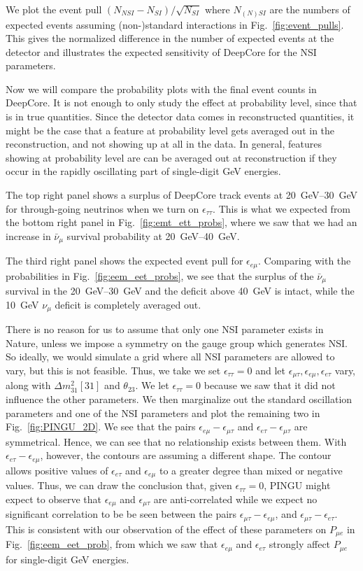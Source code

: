 \documentclass{article}
\newcommand{\emt}{\ensuremath{\epsilon_{\mu\tau}}}
\newcommand{\eet}{\epsilon_{e\tau}}
\newcommand{\eem}{\epsilon_{e\mu}}
\newcommand{\ett}{\ensuremath{\epsilon_{\tau\tau}}}
\newcommand{\nm}{\nu_\mu}
\newcommand{\anm}{\bar\nu_\mu}
\newcommand{\dm}{\Delta m^2_{31}}
\newcommand{\Pme}{P_{\mu  e}}
\begin{document}
{{ We plot the event pull $(N_{NSI} - N_{SI})/\sqrt{N_{SI}}$ where $N_{(N)SI}$ are the numbers of expected events
 assuming (non-)standard interactions in Fig.~\ref{fig:event_pulls}. This gives the normalized difference in the
 number of expected events at the detector and illustrates the expected sensitivity of DeepCore for the NSI parameters.
 
 Now we will compare the probability plots with the final event counts in DeepCore. It is not enough to only study the effect at probability level, since that is in true quantities. 
 Since the detector data comes in reconstructed quantities, it might be the case that a feature at probability level gets averaged out in the reconstruction, and not showing up at all in the data. 
 In general, features showing at probability level are can be 
 averaged out at reconstruction if they occur in the rapidly oscillating part of single-digit \si{\GeV} energies. 
 
 The top right panel shows a surplus of DeepCore track events at \SIrange{20}{30}{\GeV} for through-going neutrinos when we turn on $\ett$. This is what we expected from the bottom right panel in Fig.~\ref{fig:emt_ett_probs}, where we saw that we had an increase in $\anm$ survival probability at \SIrange{20}{40}{\GeV}. 
 
 The third right panel shows the expected event pull for $\eem$. Comparing with the probabilities in Fig.~\ref{fig:eem_eet_probs}, we see that the surplus of the $\anm$ survival in the \SIrange{20}{30}{\GeV} and the deficit above \SI{40}{\GeV} is intact, while the \SI{10}{\GeV} $\nm$ deficit is completely averaged out.
 
 There is no reason for us to assume that only one NSI parameter exists in Nature, unless we impose a symmetry on the gauge group which generates NSI. So ideally, we would simulate a grid where all NSI parameters are allowed to vary, 
 but this is not feasible. Thus, we take we set $\ett = 0$ and let $\emt,\eem,\eet$ vary, along with $\dm[31]$ and $\theta_{23}$. We let $\ett=0$ because we saw that it did not influence the other parameters. 
 We then marginalize out the standard oscillation parameters and one of the NSI parameters and plot the remaining two in Fig.~\ref{fig:PINGU_2D}. We see that the pairs $\eem - \emt$ and $\eet - \emt$ are symmetrical. 
 Hence, we can see that no relationship exists between them. With $\eet - \eem$, however, the contours are assuming a different shape. The contour allows positive values of $\eet$ and $\eem$ to a greater degree than mixed or negative values.
 Thus, we can draw the conclusion that, given $\ett = 0$, PINGU might expect to observe that $\eem$ and $\emt$ are anti-correlated while we expect no significant correlation
 to be be seen between the pairs $\emt - \eem$, and $\emt - \eet$. This is consistent with our observation of the effect of these parameters on $\Pme$ in  Fig.~\ref{fig:eem_eet_prob}, from which we 
 saw that $\eem$ and $\eet$ strongly affect $\Pme$ for single-digit \si{\GeV} energies.
 
}}
\end{document}
